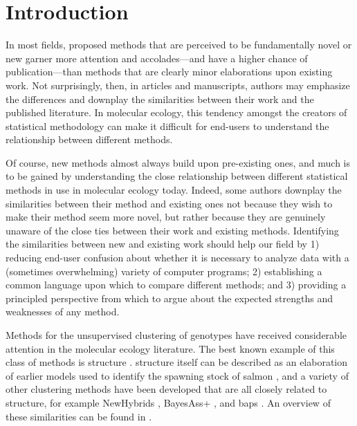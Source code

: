 
\section*{Introduction}
In most fields, proposed methods that are 
perceived to be fundamentally novel or new garner more
attention and accolades---and have a higher chance of 
publication---than methods that are clearly minor elaborations upon existing work. 
Not surprisingly, then, in articles and manuscripts, authors may 
emphasize the differences and downplay the similarities between their 
work and the published literature.   In molecular ecology, this 
tendency amongst the creators of statistical methodology can make it 
difficult for end-users to understand the relationship between 
different methods.

Of course, new methods almost always build upon pre-existing ones, and 
much is to be gained by understanding the close relationship between 
different statistical methods in use in molecular ecology today.  
Indeed, some authors downplay the similarities between their method and 
existing ones not because they wish to make their method seem more 
novel, but rather because they are genuinely unaware of the close ties 
between their work and existing methods.  Identifying the 
similarities between new and existing work should help our field
by 1) reducing end-user confusion about whether 
it is necessary to analyze data with a (sometimes overwhelming) variety 
of computer programs; 2) establishing a common language upon which to 
compare different methods; and 3) providing a principled perspective 
from which to argue about the expected strengths and weaknesses of any 
method.

Methods for the unsupervised clustering of genotypes have received 
considerable attention in the molecular ecology literature.  
The best known example of this class of methods is {\sc structure} 
\citep{Pritchardetal2000}.  {\sc structure} itself can be described 
as an elaboration of earlier models used to identify the spawning 
stock of salmon \citep{Smouseetal1990}, and a variety of other 
clustering methods have been developed that are all closely related to 
{\sc structure}, for example {\sc NewHybrids} \citep{And&Tho2002}, {\sc 
BayesAss+} \citep{Wil&Ran2003}, and {\sc baps} 
\citep{Coranderetal2004}. An overview of these similarities can be 
found in \citet{Anderson2009PGAC}.

